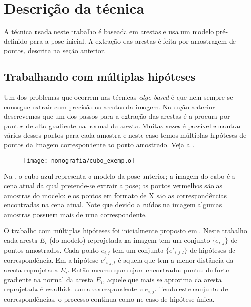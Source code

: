 \chapter{Descrição da técnica}

A técnica usada neste trabalho é baseada em arestas e usa um modelo pré-definido para a pose inicial. A extração das arestas é feita por amostragem de pontos, descrita na seção anterior.

\section{Trabalhando com múltiplas hipóteses}

Um dos problemas que ocorrem nas técnicas \emph{edge-based} é que nem sempre se consegue extrair com precisão as arestas da imagem. Na seção anterior descrevemos que um dos passos para a extração das arestas é a procura por pontos de alto gradiente na normal da aresta. Muitas vezes é possível encontrar vários desses pontos para cada amostra e neste caso temos múltiplas hipóteses de pontos da imagem correspondente ao ponto amostrado. Veja a .



\begin{figure}[ht!]
\centering
\texttt{[image: monografia/cubo\_exemplo]}
\caption{}
\label{cubo_0}
\end{figure}

Na , o cubo azul representa o modelo da pose anterior; a imagem do cubo é a cena atual da qual pretende-se extrair a pose; os pontos vermelhos são as amostras do modelo; e os pontos em formato de X são as correspondências encontradas na cena atual. Note que devido a ruídos na imagem algumas amostras possuem mais de uma correspondente.

O trabalho com múltiplas hipóteses foi inicialmente proposto em \cite{multiplas_hipoteses}. Neste trabalho cada aresta $E_i$ (do modelo) reprojetada na imagem tem um conjunto $\{e_{i,j}\}$ de pontos amostrados. Cada ponto $e_{i,j}$ tem um conjunto $\{e'_{i,j,l}\}$ de hipóteses de correspondência. Em \cite{multiplas_hipoteses} a hipótese $e'_{i,j,l}$ é aquela que tem a menor distância da aresta reprojetada $E_i$. Então mesmo que sejam encontrados pontos de forte gradiente na normal da aresta $E_i$, aquele que mais se aproxima da aresta reprojetada é escolhido como correspondente a $e_{i,j}$. Tendo este conjunto de correspondências, o processo continua como no caso de hipótese única.

